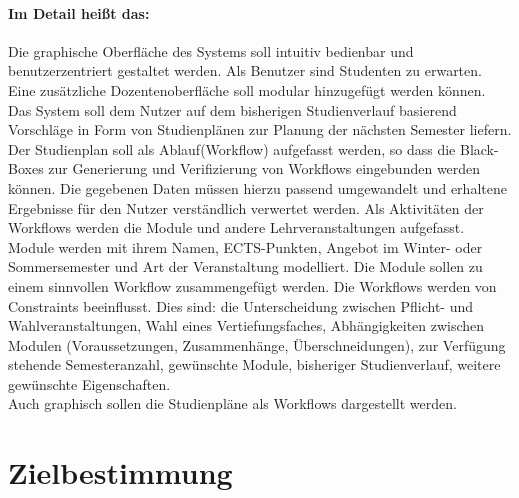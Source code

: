 \documentclass[titlepage=true, parskip=full]{scrartcl}
\begin{document}
\paragraph{Im Detail heißt das:}
Die graphische Oberfläche des Systems soll intuitiv bedienbar und benutzerzentriert gestaltet werden. Als Benutzer sind Studenten zu erwarten. Eine zusätzliche Dozentenoberfläche soll modular hinzugefügt werden können. Das System soll dem Nutzer auf dem bisherigen Studienverlauf basierend Vorschläge in Form von Studienplänen zur Planung der nächsten Semester liefern. Der Studienplan soll als Ablauf(Workflow) aufgefasst werden, so dass die Black-Boxes zur Generierung und Verifizierung von Workflows eingebunden werden können. Die gegebenen Daten müssen hierzu passend umgewandelt und erhaltene Ergebnisse für den Nutzer verständlich verwertet werden. Als Aktivitäten der Workflows werden die Module und andere Lehrveranstaltungen aufgefasst. Module werden mit ihrem Namen, ECTS-Punkten, Angebot im Winter- oder Sommersemester und Art der Veranstaltung modelliert. Die Module sollen zu einem sinnvollen Workflow zusammengefügt werden. Die Workflows werden von Constraints beeinflusst. Dies sind: die Unterscheidung zwischen Pflicht- und Wahlveranstaltungen, Wahl eines Vertiefungsfaches, Abhängigkeiten zwischen Modulen (Voraussetzungen, Zusammenhänge, Überschneidungen), zur Verfügung stehende Semesteranzahl, gewünschte Module, bisheriger Studienverlauf, weitere gewünschte Eigenschaften.\\
Auch graphisch sollen die Studienpläne als Workflows dargestellt werden. 
\section{Zielbestimmung}
\end{document}
